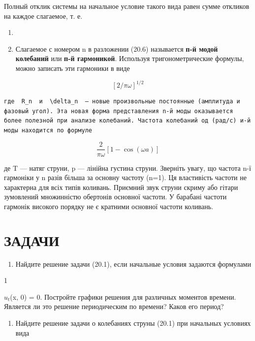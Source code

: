 \documentclass[
  ukrainian,
]{article}
\providecommand{\tightlist}{%
  \setlength{\itemsep}{0pt}\setlength{\parskip}{0pt}}
\begin{document}
Полный отклик системы на начальное условие такого вида равен сумме
откликов на каждое слагаемое, т. е.

\begin{enumerate}
\def\labelenumi{\arabic{enumi}.}
\setcounter{enumi}{3}
\tightlist
\item
\item
  Слагаемое с номером n в разложении (20.6) называется \textbf{п-й модой
  колебаний} или \textbf{п-й гармоникой}. Используя тригонометрические
  формулы, можно записать эти гармоники в виде
\end{enumerate}

\[
[2/\pi\omega]^{1/2}
\]

\begin{verbatim}
где  R_n  и  \delta_n  — новые произвольные постоянные (амплитуда и фазовый угол). Эта новая форма представления n-й моды оказывается более полезной при анализе колебаний. Частота колебаний од (рад/с) и-й моды находится по формуле
\end{verbatim}

\[
\frac{2}{\pi\omega} [1-\cos(\omega a)]
\]

де T --- натяг струни, p --- лінійна густина струни. Зверніть увагу, що
частота n-ї гармоніки у n разів більша за основну частоту (n=1). Ця
властивість частоти не характерна для всіх типів коливань. Приємний звук
струни скриму або гітари зумовлений множинністю обертонів основної
частоти. У барабані частоти гармонік високого порядку не є кратними
основної частоти коливань.

\section{ЗАДАЧИ}\label{ux437ux430ux434ux430ux447ux438}

\begin{enumerate}
\def\labelenumi{\arabic{enumi}.}
\tightlist
\item
  Найдите решение задачи (20.1), если начальные условия задаются
  формулами
\end{enumerate}

1

\(u_t\)(x, 0) = 0. Постройте графики решения для различных моментов
времени. Является ли это решение периодическим по времени? Каков его
период?

\begin{enumerate}
\def\labelenumi{\arabic{enumi}.}
\setcounter{enumi}{1}
\tightlist
\item
  Найдите решение задачи о колебаниях струны (20.1) при начальных
  условиях вида
\end{enumerate}
\end{document}
